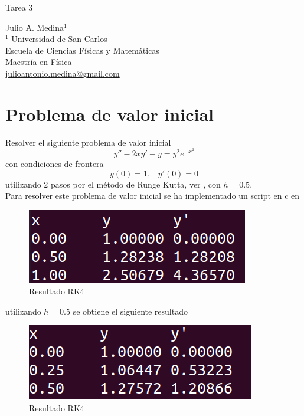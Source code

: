 \documentclass[a4paper]{article}
\begin{document}

\Large
 \begin{center}
Tarea 3\\


\hspace{10pt}

\large
Julio A. Medina$^1$ \\
\hspace{10pt}
\small  
$^1$ Universidad de San Carlos\\
Escuela de Ciencias Físicas y Matemáticas\\
Maestría en Física\\
\href{mailto:julioantonio.medina@gmail.com}{julioantonio.medina@gmail.com}\\

\end{center}

\hspace{10pt}

\normalsize
\section{Problema de valor inicial}
Resolver el siguiente problema de valor inicial
\begin{equation}
y''-2xy'-y=y^2 e^{-x^2}
\end{equation}
con condiciones de frontera
\begin{equation*}
y(0)=1,\,\,\,\,\,y'(0)=0
\end{equation*}
utilizando 2 pasos por el método de Runge Kutta, ver \cite{Burden}, con $h=0.5$.\\
Para resolver este problema de valor inicial se ha implementado un script en c en 
\begin{figure}[h]
\begin{center}
\includegraphics[scale=0.4]{./rkh05.png} 
\end{center} 
\caption{Resultado RK4}
\label{plot}
\end{figure}
utilizando $h=0.5$ se obtiene el siguiente resultado
\begin{figure}[h]
\begin{center}
\includegraphics[scale=0.4]{./rkh025.png} 
\end{center} 
\caption{Resultado RK4}
\label{plot}
\end{figure}
\end{document}
